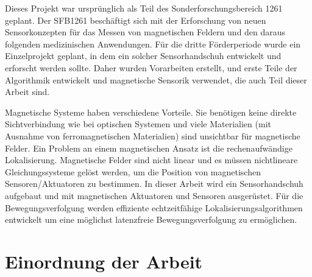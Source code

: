    Dieses Projekt war ursprünglich als Teil des Sonderforschungsbereich 1261 geplant. Der SFB1261 beschäftigt sich mit der Erforschung von neuen Sensorkonzepten für das Messen von magnetischen Feldern und den daraus folgenden medizinischen Anwendungen. Für die dritte Förderperiode wurde ein Einzelprojekt geplant, in dem ein solcher Sensorhandschuh entwickelt und erforscht werden sollte. Daher wurden Vorarbeiten erstellt, und erste Teile der Algorithmik entwickelt und magnetische Sensorik verwendet, die auch Teil dieser Arbeit sind.
   
   Magnetische Systeme haben verschiedene Vorteile. Sie benötigen keine direkte Sichtverbindung wie bei optischen Systemen und viele Materialien (mit Ausnahme von ferromagnetischen Materialien) sind unsichtbar für magnetische Felder. Ein Problem an einem magnetischen Ansatz ist die rechenaufwändige Lokalisierung. Magnetische Felder sind nicht linear und es müssen nichtlineare Gleichungssysteme gelöst werden, um die Position von magnetischen Sensoren/Aktuatoren zu bestimmen. 
   In dieser Arbeit wird ein Sensorhandschuh aufgebaut und mit magnetischen Aktuatoren und Sensoren ausgerüstet. Für die Bewegungsverfolgung werden effiziente echtzeitfähige Lokalisierungsalgorithmen entwickelt um eine möglichst latenzfreie Bewegungsverfolgung zu ermöglichen.

      
   \section{Einordnung der Arbeit}
   \label{sec:01_einordnung}
   
